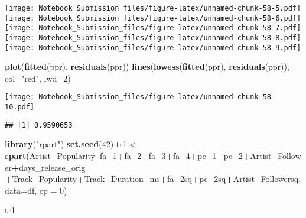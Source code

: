 \documentclass[
]{article}
\newenvironment{Shaded}{\begin{snugshade}}{\end{snugshade}}
\newcommand{\DataTypeTok}[1]{\textcolor[rgb]{0.13,0.29,0.53}{#1}}
\newcommand{\DecValTok}[1]{\textcolor[rgb]{0.00,0.00,0.81}{#1}}
\newcommand{\KeywordTok}[1]{\textcolor[rgb]{0.13,0.29,0.53}{\textbf{#1}}}
\newcommand{\NormalTok}[1]{#1}
\newcommand{\OperatorTok}[1]{\textcolor[rgb]{0.81,0.36,0.00}{\textbf{#1}}}
\newcommand{\StringTok}[1]{\textcolor[rgb]{0.31,0.60,0.02}{#1}}
\begin{document}
\texttt{[image: Notebook\_Submission\_files/figure-latex/unnamed-chunk-58-5.pdf]}
\texttt{[image: Notebook\_Submission\_files/figure-latex/unnamed-chunk-58-6.pdf]}
\texttt{[image: Notebook\_Submission\_files/figure-latex/unnamed-chunk-58-7.pdf]}
\texttt{[image: Notebook\_Submission\_files/figure-latex/unnamed-chunk-58-8.pdf]}
\texttt{[image: Notebook\_Submission\_files/figure-latex/unnamed-chunk-58-9.pdf]}

\begin{Shaded}
\begin{Highlighting}[]
\KeywordTok{plot}\NormalTok{(}\KeywordTok{fitted}\NormalTok{(ppr), }\KeywordTok{residuals}\NormalTok{(ppr))}
\KeywordTok{lines}\NormalTok{(}\KeywordTok{lowess}\NormalTok{(}\KeywordTok{fitted}\NormalTok{(ppr), }\KeywordTok{residuals}\NormalTok{(ppr)), }\DataTypeTok{col=}\StringTok{"red"}\NormalTok{, }\DataTypeTok{lwd=}\DecValTok{2}\NormalTok{)}
\end{Highlighting}
\end{Shaded}

\texttt{[image: Notebook\_Submission\_files/figure-latex/unnamed-chunk-58-10.pdf]}

\begin{Shaded}
\end{Shaded}

\begin{verbatim}
## [1] 0.9590653
\end{verbatim}

\begin{Shaded}
\begin{Highlighting}[]
\KeywordTok{library}\NormalTok{(}\StringTok{"rpart"}\NormalTok{)}
\KeywordTok{set.seed}\NormalTok{(}\DecValTok{42}\NormalTok{)}
\NormalTok{tr1 <-}\StringTok{ }\KeywordTok{rpart}\NormalTok{(Artist_Popularity}\OperatorTok{~}\NormalTok{fa_}\DecValTok{1}\OperatorTok{+}\NormalTok{fa_}\DecValTok{2}\OperatorTok{+}\NormalTok{fa_}\DecValTok{3}\OperatorTok{+}\NormalTok{fa_}\DecValTok{4}\OperatorTok{+}\NormalTok{pc_}\DecValTok{1}\OperatorTok{+}\NormalTok{pc_}\DecValTok{2}\OperatorTok{+}\NormalTok{Artist_Follower}\OperatorTok{+}\NormalTok{days_release_orig}
             \OperatorTok{+}\NormalTok{Track_Popularity}\OperatorTok{+}\NormalTok{Track_Duration_ms}\OperatorTok{+}\NormalTok{fa_2sq}\OperatorTok{+}\NormalTok{pc_2sq}\OperatorTok{+}\NormalTok{Artist_Followersq, }\DataTypeTok{data=}\NormalTok{df, }\DataTypeTok{cp =} \DecValTok{0}\NormalTok{)}

\NormalTok{tr1}
\end{Highlighting}
\end{Shaded}
\end{document}
